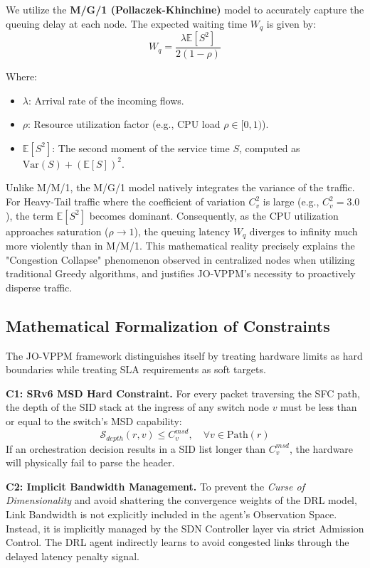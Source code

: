 We utilize the \textbf{M/G/1 (Pollaczek-Khinchine)} model to accurately capture the queuing delay at each node. The expected waiting time $W_q$ is given by:
\begin{equation}
W_q = \frac{\lambda \mathbb{E}[S^2]}{2(1-\rho)}
\end{equation}

Where:
\begin{itemize}
    \item $\lambda$: Arrival rate of the incoming flows.
    \item $\rho$: Resource utilization factor (e.g., CPU load $\rho \in [0,1)$).
    \item $\mathbb{E}[S^2]$: The second moment of the service time $S$, computed as $\text{Var}(S) + (\mathbb{E}[S])^2$.
\end{itemize}

Unlike M/M/1, the M/G/1 model natively integrates the variance of the traffic. For Heavy-Tail traffic where the coefficient of variation $C_v^2$ is large (e.g., $C_v^2 = 3.0$), the term $\mathbb{E}[S^2]$ becomes dominant. Consequently, as the CPU utilization approaches saturation ($\rho \to 1$), the queuing latency $W_q$ diverges to infinity much more violently than in M/M/1. This mathematical reality precisely explains the "Congestion Collapse" phenomenon observed in centralized nodes when utilizing traditional Greedy algorithms, and justifies JO-VPPM's necessity to proactively disperse traffic.

\subsection{Mathematical Formalization of Constraints}
The JO-VPPM framework distinguishes itself by treating hardware limits as hard boundaries while treating SLA requirements as soft targets. 

\textbf{C1: SRv6 MSD Hard Constraint.} For every packet traversing the SFC path, the depth of the SID stack at the ingress of any switch node $v$ must be less than or equal to the switch's MSD capability:
\begin{equation}
\mathcal{S}_{depth}(r, v) \le C_v^{msd}, \quad \forall v \in \text{Path}(r)
\end{equation}
If an orchestration decision results in a SID list longer than $C_v^{msd}$, the hardware will physically fail to parse the header.

\textbf{C2: Implicit Bandwidth Management.} 
To prevent the \textit{Curse of Dimensionality} and avoid shattering the convergence weights of the DRL model, Link Bandwidth is not explicitly included in the agent's Observation Space. Instead, it is implicitly managed by the SDN Controller layer via strict Admission Control. The DRL agent indirectly learns to avoid congested links through the delayed latency penalty signal.

